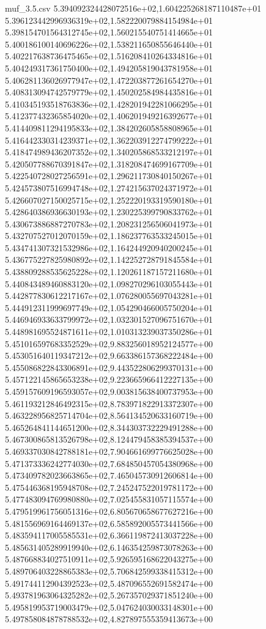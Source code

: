 \begin{filecontents*}{muf_3.5.csv}
5.394092324428072516e+02,1.604225268187110487e+01
5.396123442996936319e+02,1.582220079884154984e+01
5.398154701564312745e+02,1.560215540751414665e+01
5.400186100140696226e+02,1.538211650855646440e+01
5.402217638736475465e+02,1.516208410264334816e+01
5.404249317361750400e+02,1.494205819043781958e+01
5.406281136026977947e+02,1.472203877261654270e+01
5.408313094742579779e+02,1.450202584984435816e+01
5.410345193518763836e+02,1.428201942281066295e+01
5.412377432365854020e+02,1.406201949216392677e+01
5.414409811294195833e+02,1.384202605858808965e+01
5.416442330314239371e+02,1.362203912274799222e+01
5.418474989436207352e+02,1.340205868533212197e+01
5.420507788670391847e+02,1.318208474699167709e+01
5.422540728027256591e+02,1.296211730840150267e+01
5.424573807516994748e+02,1.274215637024371972e+01
5.426607027150025715e+02,1.252220193319590180e+01
5.428640386936630193e+02,1.230225399790833762e+01
5.430673886887270783e+02,1.208231256506041973e+01
5.432707527012070159e+02,1.186237763533245015e+01
5.434741307321532986e+02,1.164244920940200245e+01
5.436775227825980892e+02,1.142252728791845584e+01
5.438809288535625228e+02,1.120261187157211680e+01
5.440843489460883120e+02,1.098270296103055443e+01
5.442877830612217167e+02,1.076280055697043281e+01
5.444912311999697749e+02,1.054290466005750204e+01
5.446946933633799972e+02,1.032301527096751670e+01
5.448981695524871611e+02,1.010313239037350286e+01
5.451016597683352529e+02,9.883256018952124577e+00
5.453051640119347212e+02,9.663386157368222484e+00
5.455086822843306891e+02,9.443522806299370131e+00
5.457122145865653238e+02,9.223665966412227135e+00
5.459157609196593057e+02,9.003815638400737953e+00
5.461193212846492315e+02,8.783971822913372307e+00
5.463228956825714704e+02,8.564134520633160719e+00
5.465264841144651200e+02,8.344303732229491288e+00
5.467300865813526798e+02,8.124479458385394537e+00
5.469337030842788181e+02,7.904661699776625028e+00
5.471373336242774030e+02,7.684850457054380968e+00
5.473409782023663865e+02,7.465045730912606814e+00
5.475446368195948708e+02,7.245247522019781172e+00
5.477483094769980880e+02,7.025455831057115574e+00
5.479519961756051316e+02,6.805670658677627216e+00
5.481556969164469137e+02,6.585892005573441566e+00
5.483594117005585531e+02,6.366119872413037228e+00
5.485631405289919940e+02,6.146354259873078263e+00
5.487668834027510911e+02,5.926595168622043275e+00
5.489706403228865383e+02,5.706842599338415312e+00
5.491744112904392523e+02,5.487096552691582474e+00
5.493781963064325282e+02,5.267357029371851240e+00
5.495819953719003479e+02,5.047624030033148301e+00
5.497858084878788532e+02,4.827897555359413673e+00

\end{filecontents*}
